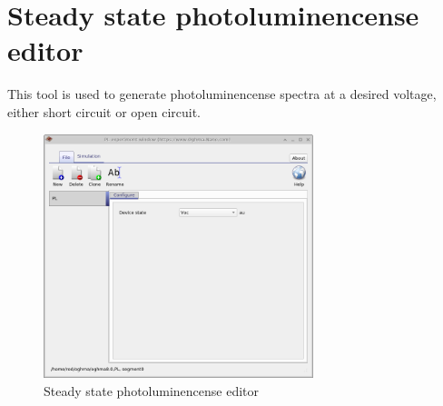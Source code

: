 \newpage
\section{Steady state photoluminencense editor}
This tool is used to generate photoluminencense spectra at a desired voltage, either short circuit or open circuit.

\begin{figure}[H]
\centering
\includegraphics[width=0.7\textwidth,height=0.5\textwidth]{./images/sim_editors/pl.png}
\caption{Steady state photoluminencense editor}
\label{fig:pleditor}
\end{figure}

